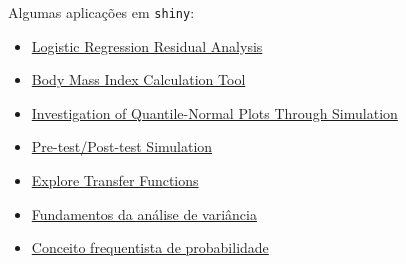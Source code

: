 \begin{frame}
  Algumas aplicações em \texttt{shiny}:
  \begin{itemize}
  \item \href{http://www.stat.cmu.edu:3838/hseltman/LogReg/}{Logistic
      Regression Residual Analysis}
  \item \href{https://ilame.shinyapps.io/Test3}{Body Mass Index
      Calculation Tool}
  \item
    \href{https://hseltman.shinyapps.io/QuantileNormal}{Investigation of
      Quantile-Normal Plots Through Simulation}
  \item
    \href{http://www.stat.cmu.edu:3838/hseltman/PrePost/}{Pre-test/Post-test
      Simulation}
  \item
    \href{http://www.stat.cmu.edu:3838/hseltman/TransferFunctions/}{Explore
      Transfer Functions}
  \item
    \href{http://nbcgib.uesc.br/lec/avale-es/amb-virtual/inferencia/anava}{Fundamentos
      da análise de variância}
  \item
    \href{http://nbcgib.uesc.br/lec/avale-es/amb-virtual/probabilidade/con-frequentista}{Conceito
      frequentista de probabilidade}
  \end{itemize}

\end{frame}
